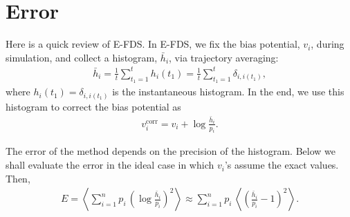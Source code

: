 \documentclass[12pt]{article}
\begin{document}
\section{Error}


Here is a quick review of E-FDS.
%
In E-FDS, we fix the bias potential, $v_i$, during simulation,
and collect a histogram, $\bar h_i$, via trajectory averaging:
%
\begin{align}
\bar h_i
=
\frac 1 t
\sum_{ t_1 = 1 }^{ t }
  h_i( t_1 )
=
\frac 1 t
\sum_{ t_1 = 1 }^{ t }
  \delta_{ i, i(t_1) },
\label{eq:hbar_def}
\end{align}
%
where $h_i(t_1) = \delta_{ i, i(t_1) }$
is the instantaneous histogram.
%
In the end,
we use this histogram to correct the bias potential as
%
\begin{align}
v_i^\mathrm{corr}
=
v_i
+
\log \frac { \bar h_i }
           {      p_i }.
\end{align}

The error of the method depends on the precision of the histogram.
%
Below we shall evaluate the error in the ideal case
in which $v_i$'s assume the exact values.
Then,
%
\begin{align}
E
=
\left\langle
  \sum_{ i = 1 }^ n
    p_i \,
    \left(
      \log \frac { \bar h_i }
                 {      p_i }
    \right)^2
\right\rangle
\approx
\sum_{ i = 1 }^ n
  p_i \,
  \left\langle
    \left(
      \frac { \bar h_i }
            {      p_i }
      - 1
    \right)^2
  \right\rangle.
\end{align}
\end{document}
